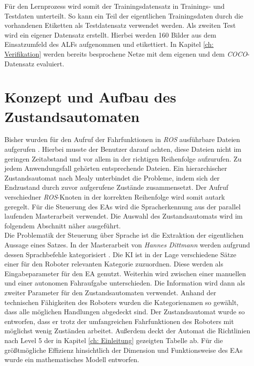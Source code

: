 		Für den Lernprozess wird somit der Trainingsdatensatz in Trainings- und Testdaten unterteilt. So kann ein Teil der eigentlichen Trainingsdaten durch die vorhandenen Etiketten als Testdatensatz verwendet werden. Als zweiten Test wird ein eigener Datensatz erstellt. Hierbei werden 160 Bilder aus dem Einsatzumfeld des ALFs aufgenommen und etikettiert. In Kapitel \ref{ch: Verifikation} werden bereits besprochene Netze mit dem eigenen und dem \textit{COCO}-Datensatz evaluiert.
		
	\section{Konzept und Aufbau des Zustandsautomaten}
	\label{sec: Umsetzung der Statemachine}
	Bisher wurden für den Aufruf der Fahrfunktionen in \textit{ROS} ausführbare Dateien aufgerufen \cite{Bachelorarbeit}. Hierbei musste der Benutzer darauf achten, diese Dateien nicht im geringen Zeitabstand und vor allem in der richtigen Reihenfolge aufzurufen. Zu jedem Anwendungsfall gehörten entsprechende Dateien. Ein hierarchischer Zustandsautomat nach Mealy unterbindet die Probleme, indem sich der Endzustand durch zuvor aufgerufene Zustände zusammensetzt. Der Aufruf verschiedner \textit{ROS}-Knoten in der korrekten Reihenfolge wird somit autark geregelt. Für die Steuerung des EAs wird die Spracherkennung aus der parallel laufenden Masterarbeit verwendet. Die Auswahl des Zustandsautomats wird im folgendem Abschnitt näher ausgeführt.\\	
	
	Die Problematik der Steuerung über Sprache ist die Extraktion der eigentlichen Aussage eines Satzes. In der Masterarbeit von \textit{Hannes Dittmann} werden aufgrund dessen Sprachbefehle kategorisiert \cite{Dittmann}. Die KI ist in der Lage verschiedene Sätze einer für den Roboter relevanten Kategorie zuzuordnen. Diese werden als Eingabeparameter für den EA genutzt. Weiterhin wird zwischen einer manuellen und einer autonomen Fahraufgabe unterschieden. Die Information wird dann als zweiter Parameter für den Zustandsautomaten verwendet. Anhand der technischen Fähigkeiten des Roboters wurden die Kategorienamen so gewählt, dass alle möglichen Handlungen abgedeckt sind. Der Zustandsautomat wurde so entworfen, dass er trotz der umfangreichen Fahrfunktionen des Roboters mit möglichst wenig Zuständen arbeitet. Außerdem deckt der Automat die Richtlinien nach Level 5 der in Kapitel \ref{ch: Einleitung} gezeigten Tabelle ab. Für die größtmögliche Effizienz hinsichtlich der Dimension und Funktionsweise des EAs wurde ein mathematisches Modell entworfen.\\
	
